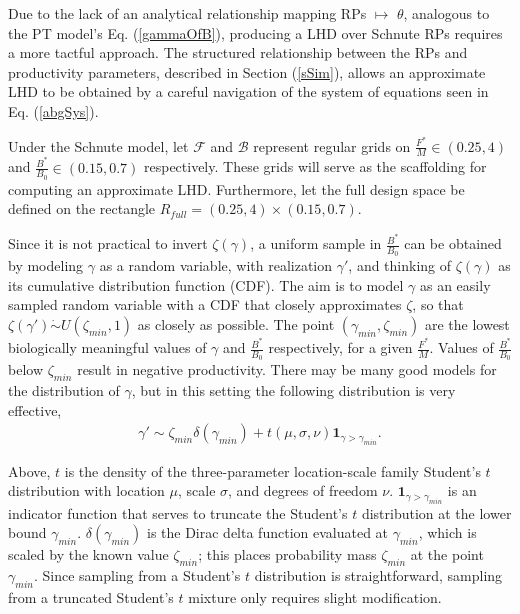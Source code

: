 Due to the lack of an analytical relationship mapping RPs $\mapsto$ $\theta$,
analogous to the PT model's Eq. (\ref{gammaOfB}), producing a LHD over Schnute 
RPs requires a more tactful approach.
The structured relationship between the RPs and productivity parameters,
described in Section (\ref{sSim}), allows an approximate LHD to be obtained by
a careful navigation of the system of equations seen in Eq. (\ref{abgSys}).

%
Under the Schnute model, let $\mathcal{F}$ and $\mathcal{B}$ represent regular grids on
\mbox{$\frac{F^*}{M}\in(0.25, 4)$} and \mbox{$\frac{B^*}{B_0}\in(0.15, 0.7)$}
respectively. These grids will serve as the scaffolding for computing an approximate LHD.
Furthermore, let the full design space be defined on the rectangle $R_{full}=(0.25, 4)\times(0.15, 0.7)$.

%
Since it is not practical to invert $\zeta(\gamma)$, a uniform sample in
$\frac{B^*}{B_0}$ can be obtained by modeling $\gamma$ as a random
variable, with realization $\gamma'$, and thinking of $\zeta(\gamma)$ as its
cumulative distribution function (CDF). The aim is to model $\gamma$ as an
easily sampled random variable with a CDF that closely approximates $\zeta$, so
that $\zeta(\gamma')\dot\sim U(\zeta_{min},1)$ as closely as possible. The 
point $(\gamma_{min}, \zeta_{min})$ are the lowest biologically meaningful
values of $\gamma$ and $\frac{B^*}{B_0}$ respectively, for a given 
$\frac{F^*}{M}$. Values of $\frac{B^*}{B_0}$ below $\zeta_{min}$ result in 
negative productivity\cite{myers_maximum_1999, punt_extending_2019}. %
There may be many good models for the distribution of $\gamma$, but in this 
setting the following distribution is very effective,
%
%
%
%
\begin{align}
\gamma' \sim \zeta_{min}\delta(\gamma_{min}) + t(\mu, \sigma, \nu)\bm{1}_{\gamma>\gamma_{min}}. \label{mixT}
\end{align}

%
Above, $t$ is the density of the three-parameter location-scale family Student's $t$
distribution with location $\mu$, scale $\sigma$, and degrees of freedom $\nu$.
$\bm{1}_{\gamma>\gamma_{min}}$ is an indicator function that serves to truncate the
Student's $t$ distribution at the lower bound $\gamma_{min}$.
$\delta(\gamma_{min})$ is the Dirac delta function evaluated at $\gamma_{min}$,
which is scaled by the known value $\zeta_{min}$; this places probability mass
$\zeta_{min}$ at the point $\gamma_{min}$. Since sampling from a Student's $t$
distribution is straightforward, sampling from a truncated Student's $t$ mixture
only requires slight modification.

